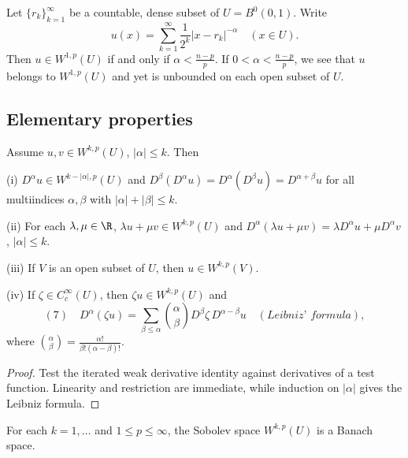 \begin{example}
\label{ex:dense-singularities-unbounded-sobolev}
Let $\{r_k\}_{k=1}^{\infty}$ be a countable, dense subset of $U = B^0(0,1)$. Write
$$u(x) = \sum_{k=1}^{\infty} \frac{1}{2^k} |x - r_k|^{-\alpha} \quad (x \in U).$$
Then $u \in W^{1,p}(U)$ if and only if $\alpha < \frac{n-p}{p}$. If $0 < \alpha < \frac{n-p}{p}$, we see that $u$ belongs to $W^{1,p}(U)$ and yet is unbounded on each open subset of $U$.
\end{example}

\subsection{Elementary properties}

\begin{theorem}
\label{thm:weak-derivative-properties}
Assume $u, v \in W^{k,p}(U)$, $|\alpha| \le k$. Then

(i) $D^{\alpha}u \in W^{k-|\alpha|,p}(U)$ and $D^{\beta}(D^{\alpha}u) = D^{\alpha}(D^{\beta}u) = D^{\alpha+\beta}u$ for all multiindices $\alpha, \beta$ with $|\alpha| + |\beta| \le k$.

(ii) For each $\lambda, \mu \in \R$, $\lambda u + \mu v \in W^{k,p}(U)$ and $D^{\alpha}(\lambda u + \mu v) = \lambda D^{\alpha}u + \mu D^{\alpha}v$, $|\alpha| \le k$.

(iii) If $V$ is an open subset of $U$, then $u \in W^{k,p}(V)$.

(iv) If $\zeta \in C_c^{\infty}(U)$, then $\zeta u \in W^{k,p}(U)$ and
$$(7) \quad D^{\alpha}(\zeta u) = \sum_{\beta \le \alpha} \binom{\alpha}{\beta} D^{\beta}\zeta\, D^{\alpha-\beta}u \quad (\textit{Leibniz' formula}),$$
where $\binom{\alpha}{\beta} = \frac{\alpha!}{\beta!(\alpha-\beta)!}$.
\end{theorem}

\begin{proof}
\sketch Test the iterated weak derivative identity against derivatives of a test function. Linearity and restriction are immediate, while induction on $|\alpha|$ gives the Leibniz formula.
\end{proof}

\begin{theorem}
\label{thm:sobolev-space-banach}
For each $k = 1, \ldots$ and $1 \le p \le \infty$, the Sobolev space $W^{k,p}(U)$ is a Banach space.
\end{theorem}

